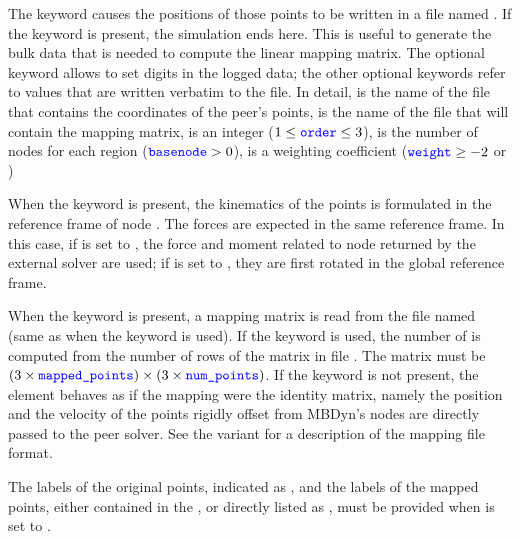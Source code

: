 The  keyword causes the positions of those points
to be written in a file named .
If the keyword  is present, the simulation ends here.
This is useful to generate the bulk data that is needed to compute
the linear mapping matrix.
The optional keyword  allows to set 
digits in the logged data; the other optional keywords refer to values
that are written verbatim to the file.
In detail,  is the name of the file that contains
the coordinates of the peer's points, 
is the name of the file that will contain the mapping matrix,
 is an integer ($1 \le \textcolor{blue}{\texttt{order}} \le 3$),
 is the number of nodes for each region ($\textcolor{blue}{\texttt{basenode}} > 0$),
 is a weighting coefficient ($\textcolor{blue}{\texttt{weight}} \ge -2$ or )

When the  keyword is present, the kinematics
of the points is formulated in the reference frame of node
.
The forces are expected in the same reference frame.
In this case, if  is set to ,
the force and moment related to node  
returned by the external solver are used;
if  is set to ,
they are first rotated in the global reference frame.

When the  keyword is present,
a mapping matrix is read from the file named 
(same as  when the  keyword is used).
If the keyword  is used, the number of 
is computed from the number of rows of the matrix
in file .
The matrix must be
$(3 \times \textcolor{blue}{\texttt{mapped\_points}}) \times (3 \times \textcolor{blue}{\texttt{num\_points}})$.
If the  keyword is not present,
the element behaves as if the mapping were the identity matrix,
namely the position and the velocity of the points rigidly offset
from MBDyn's nodes are directly passed to the peer solver.
See the 
variant for a description of the mapping file format.

The labels of the original points, indicated as ,
and the labels of the mapped points, either contained
in the ,
or directly listed as , must be provided
when  is set to .



